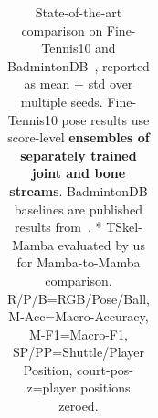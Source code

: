 \begin{table}[t!]
{\begin{tabular}{@{}llc ccc cccc ccc@{}}
        \midrule
    \end{tabular}%
    }
    \caption{State-of-the-art comparison on Fine-Tennis10 and BadmintonDB~\cite{ban2022badmintondb}, reported as mean $\pm$ std over multiple seeds. Fine-Tennis10 pose results use score-level \textbf{ensembles of separately trained joint and bone streams}. BadmintonDB baselines are published results from~\cite{BST}. * TSkel-Mamba evaluated by us for Mamba-to-Mamba comparison. R/P/B=RGB/Pose/Ball, M-Acc=Macro-Accuracy, M-F1=Macro-F1, SP/PP=Shuttle/Player Position, court-pos-z=player positions zeroed.}
    \label{tab:sota_results}
\end{table}
